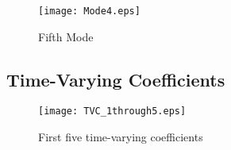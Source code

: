 \documentclass[12pt, letterpaper, twoside]{article}
\begin{document}
\begin{figure}[htbp]
    \centering
    \texttt{[image: Mode4.eps]}
    \caption{Fifth Mode}
    \label{mode4}
\end{figure}


\subsection{Time-Varying Coefficients}

\begin{figure}[htbp]
    \centering
    \texttt{[image: TVC\_1through5.eps]}
    \caption{First five time-varying coefficients}
    \label{tvc}
\end{figure}
\end{document}
